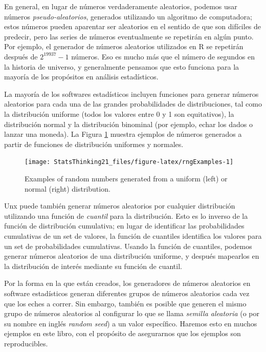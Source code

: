 \documentclass[
  12pt,
]{book}
\theoremstyle{definition}
\theoremstyle{definition}
\theoremstyle{definition}
\theoremstyle{remark}
\begin{document}
En general, en lugar de números verdaderamente aleatorios, podemos usar números \emph{pseudo-aleatorios}, generados utilizando un algoritmo de computadora; estos números pueden aparentar ser aleatorios en el sentido de que son difíciles de predecir, pero las series de números eventualmente se repetirán en algún punto. Por ejemplo, el generador de números aleatorios utilizados en R se repetirán después de \(2^{19937} - 1\) números. Eso es mucho más que el número de segundos en la historia de universo, y generalmente pensamos que esto funciona para la mayoría de los propósitos en análisis estadísticos.

La mayoría de los softwares estadísticos incluyen funciones para generar números aleatorios para cada una de las grandes probabilidades de distribuciones, tal como la distribución uniforme (todos los valores entre 0 y 1 son equitativos), la distribución normal y la distribución binominal (por ejemplo, echar los dados o lanzar una moneda). La Figura \ref{fig:rngExamples} muestra ejemplos de números generados a partir de funciones de distribución uniformes y normales.

\begin{figure}
\texttt{[image: StatsThinking21\_files/figure-latex/rngExamples-1]} \caption{Examples of random numbers generated from a uniform (left) or normal (right) distribution.}\label{fig:rngExamples}
\end{figure}

Unx puede también generar números aleatorios por cualquier distribución utilizando una función de \emph{cuantil} para la distribución. Esto es lo inverso de la función de distribución cumulativa; en lugar de identificar las probabilidades cumulativas de un set de valores, la función de cuantiles identifica los valores para un set de probabilidades cumulativas. Usando la función de cuantiles, podemos generar números aleatorios de una distribución uniforme, y después mapearlos en la distribución de interés mediante su función de cuantil.

Por la forma en la que están creados, los generadores de números aleatorios en software estadísticos generan diferentes grupos de números aleatorios cada vez que los eches a correr. Sin embargo, también es posible que generen el mismo grupo de números aleatorios al configurar lo que se llama \emph{semilla aleatoria} (o por su nombre en inglés \emph{random seed}) a un valor específico. Haremos esto en muchos ejemplos en este libro, con el propósito de asegurarnos que los ejemplos son reproducibles.
\end{document}
